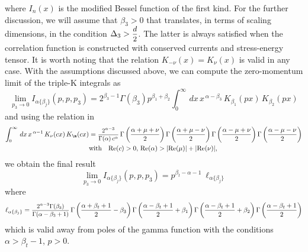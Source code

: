 \documentclass[a4paper,11pt,openright,twoside]{book}
\let\a=\alpha   \let\b=\beta   \let\g=\gamma   \let\d=\delta
\let\n=\nu      \let\x=\xi     \let\p=\pi      \let\r=\rho
\let\G=\Gamma  \let\D=\Delta \let\Q=\Theta  \let\L=\Lambda
\newcommand{\sdfrac}[2]{\mbox{\small$\displaystyle\frac{#1}{#2}$}}
\renewcommand{\Re}{\textrm{Re}}
\numberwithin{equation}{section}
\begin{document}
{{{where $I_n(x)$ is the modified Bessel function of the first kind. For the further discussion, we will assume that $\beta_3>0$ that translates, in terms of scaling dimensions, in the condition $\D_3>\sdfrac{d}{2}$. The latter is always satisfied when the correlation function is constructed with conserved currents and stress-energy tensor. It is worth noting that the relation $K_{-\nu}(x)=K_{\nu}(x)$ is valid in any case. 
With the assumptions discussed above, we can compute the zero-momentum limit of the triple-K integrals as
\begin{equation}
	\lim_{p_3\to0}I_{\a\{\b_j\}}(p,p,p_3)=2^{\b_3-1}\G(\b_3)p^{\b_1+\b_2}\int_0^\infty\,dx\,x^{\,\a-\b_3}\,K_{\b_1}(px)\,K_{\b_2}(px)
\end{equation}
and using the relation in \cite{Prudnikov} 
\begin{align}
	\int_0^\infty\,dx\,x^{\,\a-1}\,K_{\n}(cx)\,K_{\m}(cx)&=\sdfrac{2^{\a-3}}{\G(\a)\,c^\a}\,\Gamma\left(\frac{\alpha+\mu+\nu}{2}\right)\Gamma\left(\frac{\alpha+\mu-\nu}{2}\right)\Gamma\left(\frac{\alpha-\mu+\nu}{2}\right)\Gamma\left(\frac{\alpha-\mu-\nu}{2}\right)\notag\\
	&\text{with}\quad \Re(c)>0,\,\Re(\alpha)>|\Re(\mu)|+|\Re(\nu)|,
\end{align}
we obtain the final result
\begin{equation}
	\lim_{p_3\to0}I_{\a\{\b_j\}}(p,p,p_3)=p^{\b_t-\a-1}\ \ell_{\a\{\b_j\}}\label{zeromom}
\end{equation}
where
\begin{equation}
	\ell_{\a\{\b_j\}}=\sdfrac{2^{\alpha-3}\Gamma(\beta_3)}{\G(\a-\beta_3+1)}\,\Gamma\left(\frac{\alpha+\beta_t+1}{2}-\beta_3\right)\Gamma\left(\frac{\alpha-\beta_t+1}{2}+\beta_1\right)\Gamma\left(\frac{\alpha-\beta_t+1}{2}+\beta_2\right)\Gamma\left(\frac{\alpha-\beta_t+1}{2}\right)\label{ldef}
\end{equation}
which is valid away from poles of the gamma function with the conditions $\a>\b_t-1$, $p>0$. 
}}}
\end{document}
